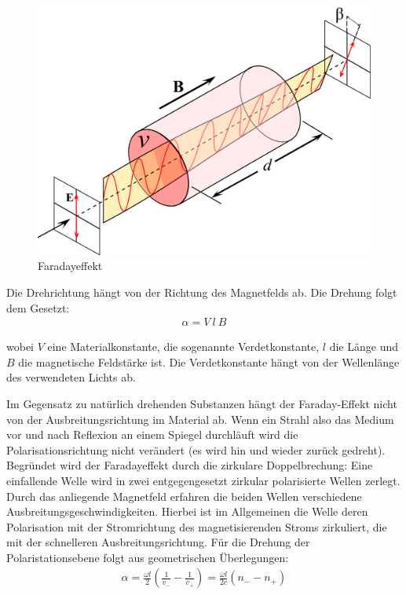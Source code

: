 \documentclass[12pt]{article}
\begin{document}
\begin{figure}[H]
\centering
\includegraphics[width=0.8\linewidth]{pictures/faraday-effect.eps}
\caption{Faradayeffekt}
\end{figure}

Die Drehrichtung hängt von der Richtung des Magnetfelds ab. Die Drehung folgt dem Gesetzt:
\begin{align}
 \alpha = V ~ l ~ B
\end{align}

wobei $V$ eine Materialkonstante, die sogenannte Verdetkonstante, $l$ die Länge und $B$ die magnetische Feldstärke ist.
Die Verdetkonstante hängt von der Wellenlänge des verwendeten Lichts ab.

Im Gegensatz zu natürlich drehenden Substanzen hängt der Faraday-Effekt nicht von der Ausbreitungsrichtung im Material ab.
Wenn ein Strahl also das Medium vor und nach Reflexion an einem Spiegel durchläuft wird die Polarisationsrichtung nicht verändert (es wird hin und wieder zurück gedreht).\\

Begründet wird der Faradayeffekt durch die zirkulare Doppelbrechung: Eine einfallende Welle wird in zwei entgegengesetzt zirkular polarisierte Wellen zerlegt. Durch das anliegende Magnetfeld erfahren die beiden Wellen verschiedene Ausbreitungsgeschwindigkeiten. Hierbei ist im Allgemeinen die Welle deren Polarisation mit der Stromrichtung des magnetisierenden Stroms zirkuliert, die mit der schnelleren Ausbreitungsrichtung.
Für die Drehung der Polaristationsebene folgt aus geometrischen Überlegungen:
\begin{align}
 \alpha = \frac{\omega l}{2} \left( \frac{1}{v_-} - \frac{1}{v_+} \right) = \frac{\omega l}{2 c} ( n_- - n_+)
\end{align}
\end{document}
